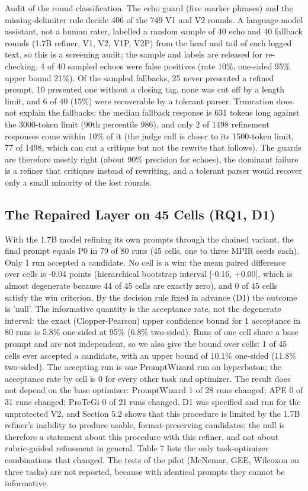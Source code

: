 \documentclass{ieeeaccess}
\begin{document}
Audit of the round classification. The echo guard (five marker phrases) and the missing-delimiter rule decide 406 of the 749 V1 and V2 rounds. A language-model assistant, not a human rater, labelled a random sample of 40 echo and 40 fallback rounds (1.7B refiner, V1, V2, V1P, V2P) from the head and tail of each logged text, so this is a screening audit; the sample and labels are released for re-checking. 4 of 40 sampled echoes were false positives (rate 10\%, one-sided 95\% upper bound 21\%). Of the sampled fallbacks, 25 never presented a refined prompt, 10 presented one without a closing tag, none was cut off by a length limit, and 6 of 40 (15\%) were recoverable by a tolerant parser. Truncation does not explain the fallbacks: the median fallback response is 631 tokens long against the 3000-token limit (90th percentile 986), and only 2 of 1498 refinement responses come within 10\% of it (the judge call is closer to its 1500-token limit, 77 of 1498, which can cut a critique but not the rewrite that follows). The guards are therefore mostly right (about 90\% precision for echoes), the dominant failure is a refiner that critiques instead of rewriting, and a tolerant parser would recover only a small minority of the lost rounds.

\subsection{The Repaired Layer on 45 Cells (RQ1, D1)}

With the 1.7B model refining its own prompts through the chained variant, the final prompt equals P0 in 79 of 80 runs (45 cells, one to three MPIR seeds each). Only 1 run accepted a candidate. No cell is a win: the mean paired difference over cells is -0.04 points (hierarchical bootstrap interval [-0.16, +0.00], which is almost degenerate because 44 of 45 cells are exactly zero), and 0 of 45 cells satisfy the win criterion. By the decision rule fixed in advance (D1) the outcome is 'null'. The informative quantity is the acceptance rate, not the degenerate interval: the exact (Clopper-Pearson) upper confidence bound for 1 acceptance in 80 runs is 5.8\% one-sided at 95\% (6.8\% two-sided). Runs of one cell share a base prompt and are not independent, so we also give the bound over cells: 1 of 45 cells ever accepted a candidate, with an upper bound of 10.1\% one-sided (11.8\% two-sided). The accepting run is one PromptWizard run on hyperbaton; the acceptance rate by cell is 0 for every other task and optimizer. The result does not depend on the base optimizer: PromptWizard 1 of 28 runs changed; APE 0 of 31 runs changed; ProTeGi 0 of 21 runs changed. D1 was specified and run for the unprotected V2, and Section 5.2 shows that this procedure is limited by the 1.7B refiner's inability to produce usable, format-preserving candidates; the null is therefore a statement about this procedure with this refiner, and not about rubric-guided refinement in general. Table 7 lists the only task-optimizer combinations that changed. The tests of the pilot (McNemar, GEE, Wilcoxon on three tasks) are not reported, because with identical prompts they cannot be informative.
\end{document}
